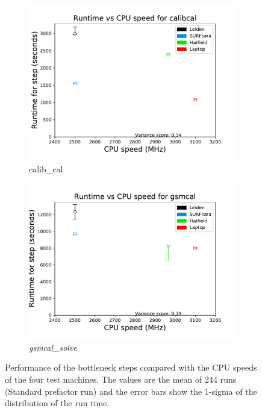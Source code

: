 \begin{figure}
    \centering
\begin{subfigure}[b]{0.45\linewidth}
    \includegraphics[width=\linewidth]{ch4/figures/fig7/calibcalCPU.pdf}
      \caption{calib\_cal }
	\label{fig:ch4_calib_cal_CPU}
 \end{subfigure}%
 \begin{subfigure}[b]{0.45\linewidth}
    \includegraphics[width=\linewidth]{ch4/figures/fig7/gsmcalCPU.pdf}
      \caption{\textit{gsmcal\_solve}}
	\label{fig:ch4_gsmcal_CPU}
 \end{subfigure}
 \label{fig:ch4_CPU_3_steps}
    \caption[Effect of CPU speeds on the bottle neck steps for the four test machines.]{Performance of the bottleneck steps compared with the CPU speeds of the four test machines. The values are the mean of 244 runs (Standard prefactor run) and the error bars show the 1-sigma of the distribution of the run time. } 

\hfill        %
\end{figure}

